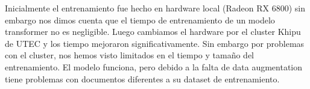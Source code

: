 \documentclass[../main.tex]{subfiles}
\begin{document}
Inicialmente el entrenamiento fue hecho en hardware local (Radeon RX 6800) sin embargo nos dimos cuenta
que el tiempo de entrenamiento de un modelo transformer no es negligible.
Luego cambiamos el hardware por el cluster Khipu de UTEC y los tiempo mejoraron significativamente.
Sin embargo por problemas con el cluster, nos hemos visto limitados en el tiempo y tamaño del entrenamiento.
El modelo funciona, pero debido a la falta de data augmentation tiene problemas con documentos diferentes
a su dataset de entrenamiento.

\end{document}
